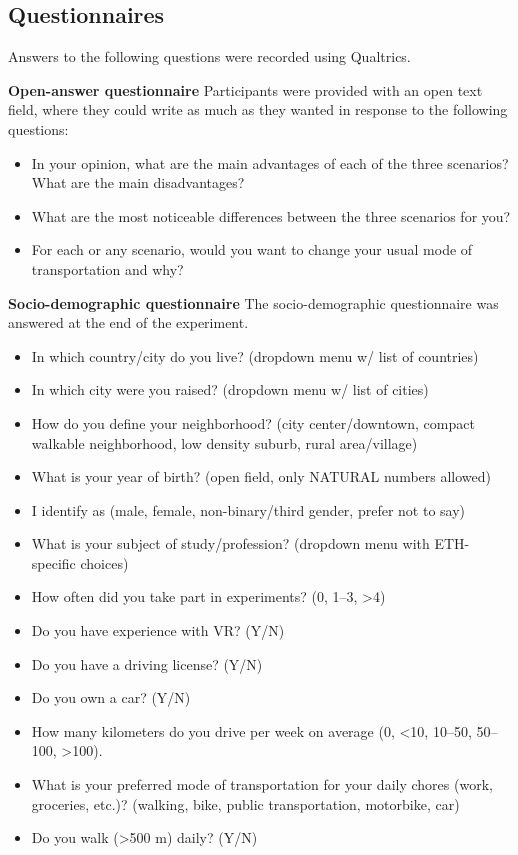 \subsection{Questionnaires}\label{apx:quest}

Answers to the following questions were recorded using Qualtrics.

\noindent \textbf{Open-answer questionnaire}
Participants were provided with an open text field, where they could write as much as they wanted in response to the following questions:
\begin{itemize}
    \item In your opinion, what are the main advantages of each of the three scenarios? What are the main disadvantages?
    \item What are the most noticeable differences between the three scenarios for you?
    \item For each or any scenario, would you want to change your usual mode of transportation and why?
\end{itemize}

\noindent \textbf{Socio-demographic questionnaire}
\noindent The socio-demographic questionnaire was answered at the end of the experiment.
    \begin{itemize}
    \item In which country/city do you live? (dropdown menu w/ list of countries)
    \item In which city were you raised? (dropdown menu w/ list of cities)
    \item How do you define your neighborhood? (city center/downtown, compact walkable neighborhood, low density suburb, rural area/village)
    \item What is your year of birth? (open field, only NATURAL numbers allowed)
    \item I identify as (male, female, non-binary/third gender, prefer not to say)
    \item What is your subject of study/profession? (dropdown menu with ETH-specific choices)
    \item How often did you take part in experiments? (0, 1--3, >4)
    \item Do you have experience with VR? (Y/N)
    \item Do you have a driving license? (Y/N)
    \item Do you own a car? (Y/N)
    \item How many kilometers do you drive per week on average (0, <10, 10--50, 50--100, >100).
    \item What is your preferred mode of transportation for your daily chores (work, groceries, etc.)? (walking, bike, public transportation, motorbike, car)
    \item Do you walk (>500 m) daily? (Y/N)
    \end{itemize}


